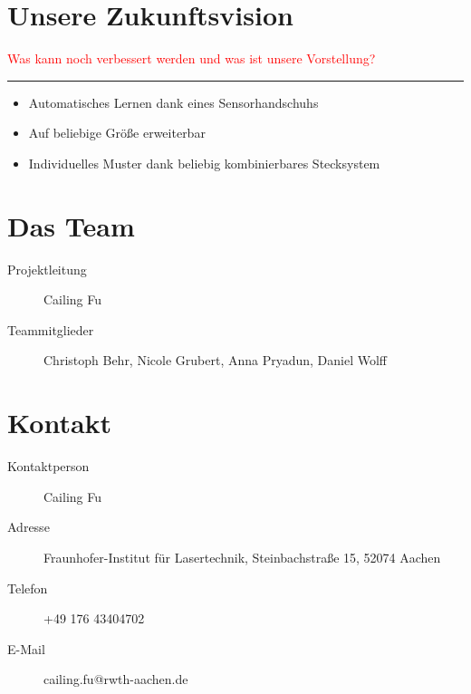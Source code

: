 \documentclass[a4paper,12pt,notumble]{leaflet}
\begin{document}
\newpage
\thispagestyle{empty}
\quad 
\newpage



\noindent
\begin{minipage}[c][0.45\textheight][t]{\textwidth}
	\section{Unsere Zukunftsvision}
	\textcolor{red}{Was kann noch verbessert werden und was ist unsere Vorstellung?}
\end{minipage}

\textcolor{rwth-lblue}{\noindent\rule{\textwidth}{4pt}}

\noindent
\begin{minipage}[c][0.45\textheight][t]{\textwidth}
	\begin{itemize}
		\item Automatisches Lernen dank eines Sensorhandschuhs
		\item Auf beliebige Größe erweiterbar
		\item Individuelles Muster dank beliebig kombinierbares Stecksystem
	\end{itemize}
\end{minipage}

\newpage



\noindent
\begin{minipage}[c][0.45\textheight][t]{\textwidth}
	\section{Das Team}
	\begin{description}
		\item[Projektleitung] Cailing Fu
		\item[Teammitglieder] Christoph Behr, Nicole Grubert, Anna Pryadun, Daniel Wolff
	\end{description}

	\section{Kontakt}
	\begin{description}
		\item[Kontaktperson] Cailing Fu 
		\item[Adresse] Fraunhofer-Institut für Lasertechnik, Steinbachstraße 15, 52074 Aachen
		\item[Telefon] +49 176 43404702
		\item[E-Mail] cailing.fu@rwth-aachen.de
	\end{description}
\end{minipage}
\end{document}
